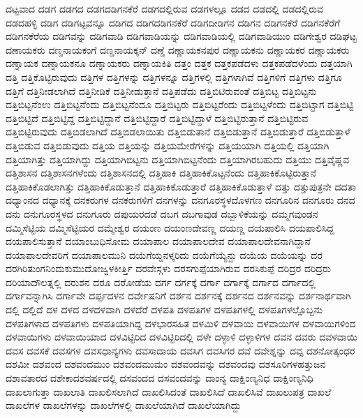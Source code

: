 {ದಟ್ಟವಾದ
ದಡಗ
ದಡಗದ
ದಡಗದಡಿಗನಕೆರೆ
ದಡಗದಲ್ಲಿರುವ
ದಡಗಳಲ್ಲೂ
ದಡದ
ದಡದಲ್ಲಿ
ದಡದಲ್ಲಿರುವ
ದಡದಹಳ್ಳಿ
ದಡಿಗ
ದಡಿಗಟ್ಟವನ್ನೂ
ದಡಿಗದ
ದಡಿಗದಡಿಗನಕೆರೆ
ದಡಿಗದೀಡಿಗನ
ದಡಿಗನ
ದಡಿಗನಕೆರೆ
ದಡಿಗನಕೆರೆಗೆ
ದಡಿಗನಕೆರೆಯ
ದಡಿಗವನ್ನು
ದಡಿಗವಾಡಿ
ದಡಿಗವಾಡಿಯನ್ನು
ದಡಿಗವಾಡಿಯಲ್ಲಿ
ದಡಿಗವಾಡಿಯುಂ
ದಡಿಗೇಶ್ವರ
ದಡಿಘಟ್ಟ
ದಣಾಯಕರು
ದಣ್ಡನಾಯಕಂಗೆ
ದಣ್ಡನಾಯಕ್ಕನ್
ದಣ್ಡೆ
ದಣ್ಣಾಯಕನಪುರ
ದಣ್ಣಾಯಕನು
ದಣ್ಣಾಯಕರ
ದಣ್ಣಾಯಕರು
ದಣ್ನಾಯಕ
ದಣ್ನಾಯಕನೂ
ದಣ್ನಾಯಕರು
ದಣ್ನಾಯಕಿತಿ
ದತ್ತಂ
ದತ್ತಕ
ದತ್ತಕಪಡೆದಳು
ದತ್ತಕಪಡೆದಳೆಂದು
ದತ್ತಯಾಗಿ
ದತ್ತಿ
ದತ್ತಿಕೊಟ್ಟಿರುವುದು
ದತ್ತಿಗಳ
ದತ್ತಿಗಳನ್ನು
ದತ್ತಿಗಳನ್ನೂ
ದತ್ತಿಗಳಲ್ಲಿ
ದತ್ತಿಗಳಾಗಿವೆ
ದತ್ತಿಗಳಿಗೆ
ದತ್ತಿಗಳು
ದತ್ತಿಗೂ
ದತ್ತಿಗೆ
ದತ್ತಿನೀಡಲಾಗಿದೆ
ದತ್ತಿನೀಡಿಕೆ
ದತ್ತಿನೀಡುತ್ತಾನೆ
ದತ್ತಿಪಡೆದು
ದತ್ತಿಬಿಟಿರುವಂತೆ
ದತ್ತಿಬಿಟ್ಟ
ದತ್ತಿಬಿಟ್ಟನು
ದತ್ತಿಬಿಟ್ಟನೆಂಉ
ದತ್ತಿಬಿಟ್ಟನೆಂದು
ದತ್ತಿಬಿಟ್ಟನೆಂದೂ
ದತ್ತಿಬಿಟ್ಟರು
ದತ್ತಿಬಿಟ್ಟರೆಂದು
ದತ್ತಿಬಿಟ್ಟಳೆಂದು
ದತ್ತಿಬಿಟ್ಟಾಗ
ದತ್ತಿಬಿಟ್ಟಿ
ದತ್ತಿಬಿಟ್ಟಿದೆ
ದತ್ತಿಬಿಟ್ಟಿದ್ದ
ದತ್ತಿಬಿಟ್ಟಿದ್ದಾನೆ
ದತ್ತಿಬಿಟ್ಟಿದ್ದಾರೆ
ದತ್ತಿಬಿಟ್ಟಿದ್ದಾಳೆ
ದತ್ತಿಬಿಟ್ಟಿರುತ್ತಾನೆ
ದತ್ತಿಬಿಟ್ಟಿರುವ
ದತ್ತಿಬಿಟ್ಟಿರುವುದು
ದತ್ತಿಬಿಡಲಾಗಿದೆ
ದತ್ತಿಬಿಡಲಾಯಿತು
ದತ್ತಿಬಿಡುತಾನೆ
ದತ್ತಿಬಿಡುತ್ತಾನೆ
ದತ್ತಿಬಿಡುತ್ತಾರೆ
ದತ್ತಿಬಿಡುತ್ತಾಳೆ
ದತ್ತಿಬಿಡುವ
ದತ್ತಿಬಿಡುವುದು
ದತ್ತಿಯ
ದತ್ತಿಯನ್ನು
ದತ್ತಿಯಮೇರೆಗಳನ್ನು
ದತ್ತಿಯಯಾಗಿ
ದತ್ತಿಯಲ್ಲಿ
ದತ್ತಿಯಾಗಿ
ದತ್ತಿಯಾಗಿತ್ತು
ದತ್ತಿಯಾಗಿದ್ದು
ದತ್ತಿಯಾಗಿಬಿಟ್ಟನು
ದತ್ತಿಯಾಗಿಬಿಟ್ಟನೆಂದು
ದತ್ತಿಯಾಗಿರಬಹುದು
ದತ್ತಿಯು
ದತ್ತಿವೈಷ್ಣವ
ದತ್ತಿಶಾಸನ
ದತ್ತಿಶಾಸನಗಳೆಂದು
ದತ್ತಿಶಾಸನದಲ್ಲಿ
ದತ್ತಿಹಾಕಿ
ದತ್ತಿಹಾಕಿಕೊಟ್ಟನೆಂದು
ದತ್ತಿಹಾಕಿಕೊಟ್ಟಿರುತ್ತಾನೆ
ದತ್ತಿಹಾಕಿಕೊಡಲಾಗಿತ್ತು
ದತ್ತಿಹಾಕಿಕೊಡುತ್ತಾನೆ
ದತ್ತಿಹಾಕಿಕೊಡುತ್ತಾರೆ
ದತ್ತಿಹಾಕಿಕೊಡುತ್ತಾಳೆ
ದತ್ತು
ದತ್ತುಪುತ್ರನೇ
ದದತಾ
ದಧ್ಯಾಂನದ
ದಧ್ಯಾನಕ್ಕೆ
ದನಕರುಗಳ
ದನಕರುಗಳಿಗೆ
ದನಗಳನ್ನು
ದನಗೂರಸ್ಥಳದೊಳಗಣ
ದನಗೂರಿನ
ದನಗೂರು
ದನದ
ದನು
ದನುಗೂರಸ್ಥಳದ
ದನುಗೂರು
ದಪುಯರದಡೆ
ದಬಗ
ದಬಗಾವುಡ
ದಬ್ಬಾಳಿಕೆಯನ್ನು
ದಮ್ಮಗವುಂಡನ
ದಮ್ಮಿಸೆಟ್ಟಿಯ
ದಮ್ಮಿಸೆಟ್ಟಿಯರ
ದಮ್ಮೇಶ್ವರ
ದಯಂಣ
ದಯಂಣದೇವಣ್ಣ
ದಯಣ್ಣ
ದಯಪಾಲಿಸಿ
ದಯಪಾಲಿಸಿದ್ದ
ದಯಪಾಲಿಸುತ್ತಾನೆ
ದಯಾಂಬುಧಿಸೋಮ
ದಯಾಪಾಲ
ದಯಾಪಾಲದೇವ
ದಯಾಪಾಲದೇವನಾಗಿದ್ದಾನೆ
ದಯಾಪಾಲದೇವರಿಗೆ
ದಯಾಪಾಲಮುನಿ
ದಯೆಗೆಯ್ದನಳ್ಕರಿದು
ದಯೆಗೆಯ್ಯೆನ್ದು
ದಯೆಯ
ದಯೆಯನ್ನು
ದರ
ದರಗಿರಿತುಂಗನಿಂದುಕುಮುದೋಜ್ವಳಕೀರ್ತ್ತಿ
ದರವೇಸ್ಗಳು
ದರಸಗುಪ್ಪೆಯಾಗಿರುವ
ದರಸಿಕುಪ್ಪೆ
ದರಿದ್ರರ
ದರಿದ್ರರು
ದರಿಯಾದೌಲತ್ನಲ್ಲಿ
ದರುಶನ
ದರೂ
ದರೋಡೆಯ
ದರ್ಗ
ದರ್ಗಕ್ಕೆ
ದರ್ಗಾ
ದರ್ಗಾಕ್ಕೆ
ದರ್ಗಾದ
ದರ್ಗಾದಲ್ಲಿ
ದರ್ಗಾವನ್ನಾಗಿಸಿ
ದರ್ಗಾವೇ
ದರ್ಪ್ಪದಳನ
ದರ್ವೇಷನಿಗೆ
ದರ್ಶನ
ದರ್ಶನಕ್ಕೆ
ದರ್ಶನದ
ದರ್ಶನವನ್ನು
ದರ್ಶನಾರ್ಥವಾಗಿ
ದಲ್ಲಿ
ದಲ್ಲಿದೆ
ದಳ
ದಳದ
ದಳದಳವಾಗಿ
ದಳದೆರೆ
ದಳಪತಿ
ದಳಪತಿಗಳ
ದಳಪತಿಗಳಲ್ಲಿ
ದಳಪತಿಗಳಲ್ಲೊಬ್ಬನು
ದಳಪತಿಗಳಾದ
ದಳಪತಿಗಳು
ದಳಪತಿಯಾಗಿದ್ದ
ದಳಭಾರಸಹಿತ
ದಳಮಿಳಿ
ದಳವಾಯಿ
ದಳವಾಯಿಗಳ
ದಳವಾಯಿಗಳಿಂದ
ದಳವಾಯಿಗಳು
ದಳವಾಯಿಯಾದ
ದಳವಿಟ್ಟಿರಿದ
ದಳವಿಟ್ಟಿರಿದಲ್ಲಿ
ದಳೇ
ದಳ್ಳಾಳಿ
ದಳ್ಳಾಳಿಗಳ
ದವನ
ದವರು
ದವಳವಾಯಿ
ದವಸ
ದವಸಕೆ
ದವಸಗಳ
ದವಸಧಾನ್ಯಗಳು
ದವಸಾದಾಯ
ದವಸಿಗ
ದವಸಿಗರ
ದವೆ
ದವೇಶ್ನನ್ನು
ದವ್ಸ
ದಶನೋತ್ಕಂಧರ
ದಶಮೀ
ದಶವಂದ
ದಶವಂದಮುಂ
ದಶವಂದಮುಮಂ
ದಶವಂದವನ್ನು
ದಶವಂದವು
ದಶಸೂರಿಗಳಹತ್ತುಜನ
ದಶಾವತಾರದ
ದಶೇಕಾದಶವರ್ಷದಲ್ಲಿ
ದಸವಂದದ
ದಸವಂದವನ್ನು
ದಾಂನ್ಯ
ದಾಕ್ಷಿಂಣ್ಯನಿಧ
ದಾಕ್ಷಿಂಣ್ಯನಿಧಿ
ದಾಖಲಾಗುತ್ತಾ
ದಾಖಲಾತಿ
ದಾಖಲಿಸಲಾಗಿದೆ
ದಾಖಲಿಸಿದಂತೆ
ದಾಖಲಿಸಿದೆ
ದಾಖಲಿಸಿವೆ
ದಾಖಲುಪತ್ರ
ದಾಖಲೆ
ದಾಖಲೆಗಳ
ದಾಖಲೆಗಳನ್ನು
ದಾಖಲೆಗಳಲ್ಲಿ
ದಾಖಲೆಯಾಗಿದೆ
ದಾಖಲೆಯಾಗಿದ್ದು
}
